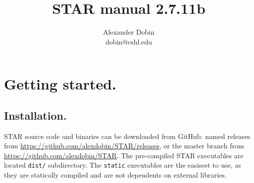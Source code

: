 \documentclass[12pt]{article}
\begin{document}
\hypersetup{
	linkcolor=MidnightBlue
	}


\newcommand{\optn}[1]{\sloppy\textcolor{violet}{\texttt{--#1}}}
\newcommand{\opt}[1]{\sloppy\hyperlink{#1}{\optn{#1}}}
\newcommand{\optv}[1]{\sloppy\texttt{#1}}
\newcommand{\optvr}[1]{\sloppy\textit{\texttt{#1}}}

\newcommand{\code}[1]{\sloppy\texttt{#1}}

\newcommand{\codelines}[1]{\begin{adjustwidth}{0.5in}{0in}
	\raggedright\texttt{#1}
	\end{adjustwidth}}

\newcommand{\ofilen}[1]{\sloppy\texttt{#1}}

\newcommand{\sechyperref}[1]{\hyperref[#1]{Section \ref{#1}. \nameref{#1}}}

\title{STAR manual 2.7.11b}
\author{Alexander Dobin\\
dobin@cshl.edu}
\maketitle

\makeatletter
\renewcommand*\l@subsection{\@dottedtocline{2}{1.8em}{2.7 em}}
\renewcommand*\l@subsubsection{\@dottedtocline{2}{4.5em}{2.7 em}}
\makeatother
\tableofcontents

\newpage

\section{Getting started.}
\subsection{Installation.}

STAR source code and binaries can be downloaded from GitHub: named releases from \url{https://github.com/alexdobin/STAR/releases}, or the master branch from \url{https://github.com/alexdobin/STAR}. The pre-compiled STAR executables are  located \code{dist/} subdirectory. The \code{static} executables are the easisest to use, as they are statically compiled and are not dependents on external libraries.
\end{document}
